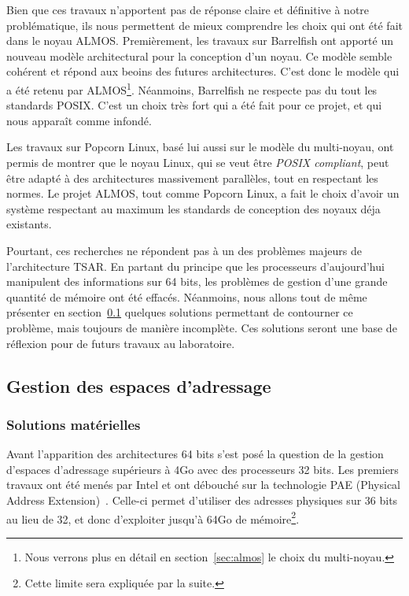       Bien que ces travaux n'apportent pas de réponse claire et définitive à
      notre problématique, ils nous permettent de mieux comprendre les choix qui
      ont été fait dans le noyau ALMOS. Premièrement, les travaux sur Barrelfish
      ont apporté un nouveau modèle architectural pour la conception d'un
      noyau. Ce modèle semble cohérent et répond aux beoins des futures
      architectures. C'est donc le modèle qui a été retenu par
      ALMOS\footnote{Nous verrons plus en détail en section~\ref{sec:almos} le
        choix du multi-noyau.}. Néanmoins, Barrelfish ne respecte pas du tout
      les standards POSIX. C'est un choix très fort qui a été fait pour ce
      projet, et qui nous apparaît comme infondé.

      Les travaux sur Popcorn Linux, basé lui aussi sur le modèle du
      multi-noyau, ont permis de montrer que le noyau Linux, qui se veut être
      \textit{POSIX compliant}, peut être adapté à des architectures massivement
      parallèles, tout en respectant les normes. Le projet ALMOS, tout comme
      Popcorn Linux, a fait le choix d'avoir un système respectant au maximum
      les standards de conception des noyaux déja existants.

      Pourtant, ces recherches ne répondent pas à un des problèmes majeurs de
      l'architecture TSAR. En partant du principe que les processeurs
      d'aujourd'hui manipulent des informations sur 64 bits, les problèmes de
      gestion d'une grande quantité de mémoire ont été effacés. Néanmoins, nous
      allons tout de même présenter en section~\ref{sec:memory} quelques
      solutions permettant de contourner ce problème, mais toujours de manière
      incomplète. Ces solutions seront une base de réflexion pour de futurs
      travaux au laboratoire.
    
     

  \subsection{Gestion des espaces d'adressage}
  \label{sec:memory}    

    \subsubsection{Solutions matérielles}

      Avant l'apparition des architectures 64 bits s'est posé la question de la
      gestion d'espaces d'adressage supérieurs à 4Go avec des processeurs 32
      bits. Les premiers travaux ont été menés par Intel et ont débouché sur la
      technologie PAE (Physical Address
      Extension)~\citep{patent6349380}. Celle-ci permet d'utiliser des adresses
      physiques sur 36 bits au lieu de 32, et donc d'exploiter jusqu'à 64Go de
      mémoire\footnote{Cette limite sera expliquée par la suite.}.

